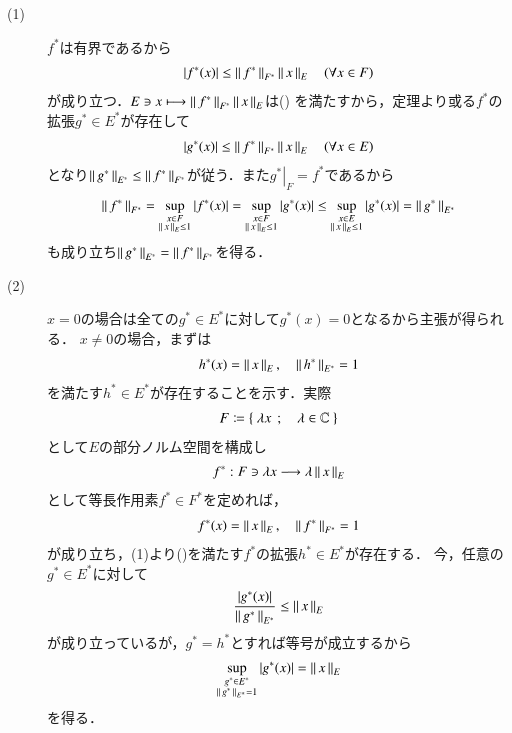 	\begin{prf}\mbox{}
		\begin{description}
			\item[(1)]
				$f^*$は有界であるから
				\begin{align}
					\left| f^*(x) \right| \leq \left\|\, f^*\, \right\|_{F^*} \left\|\, x\, \right\|_{E} \quad (\forall x \in F)
				\end{align}
				が成り立つ．$E \ni x \longmapsto \left\|\, f^*\, \right\|_{F^*} \left\|\, x\, \right\|_{E}$は()
				を満たすから，定理より或る$f^*$の拡張$g^* \in E^*$が存在して
				\begin{align}
					\left| g^*(x) \right| \leq \left\|\, f^*\, \right\|_{F^*} \left\|\, x\, \right\|_{E} \quad (\forall x \in E)
				\end{align}
				となり$\left\|\, g^*\, \right\|_{E^*} \leq \left\|\, f^*\, \right\|_{F^*}$が従う．また$\left. g^* \right|_F = f^*$であるから
				\begin{align}
					\left\|\, f^*\, \right\|_{F^*} = \operatorname*{sup}_{\substack{x \in F \\ \left\|\, x\, \right\|_{E} \leq 1}} \left| f^*(x) \right|
					= \operatorname*{sup}_{\substack{x \in F \\ \left\|\, x\, \right\|_{E} \leq 1}} \left| g^*(x) \right|
					\leq \operatorname*{sup}_{\substack{x \in E \\ \left\|\, x\, \right\|_{E} \leq 1}} \left| g^*(x) \right|
					= \left\|\, g^*\, \right\|_{E^*}
				\end{align}
				も成り立ち$\left\|\, g^*\, \right\|_{E^*} = \left\|\, f^*\, \right\|_{F^*}$を得る．
			
			\item[(2)]
				$x = 0$の場合は全ての$g^* \in E^*$に対して$g^*(x) = 0$となるから主張が得られる．
				$x \neq 0$の場合，まずは
				\begin{align}
					h^*(x) = \left\|\, x\, \right\|_{E},
					\quad \left\|\, h^*\, \right\|_{E^*} = 1
					\label{eq:cor_hahn_banach_extension}
				\end{align}
				を満たす$h^* \in E^*$が存在することを示す．実際
				\begin{align}
					F \coloneqq \left\{\ \lambda x\ \, ; \quad \lambda \in \mathbb{C}\ \right\}
				\end{align}
				として$E$の部分ノルム空間を構成し
				\begin{align}
					f^*:F \ni \lambda x \longrightarrow \lambda \left\|\, x\, \right\|_{E}
				\end{align}
				として等長作用素$f^* \in F^*$を定めれば，
				\begin{align}
					f^*(x) = \left\|\, x\, \right\|_{E},
					\quad \left\|\, f^*\, \right\|_{F^*} = 1
				\end{align}
				が成り立ち，(1)より()を満たす$f^*$の拡張$h^* \in E^*$が存在する．
				今，任意の$g^* \in E^*$に対して
				\begin{align}
					\frac{\left| g^*(x) \right|}{\left\|\, g^*\, \right\|_{E^*}} \leq \left\|\, x\, \right\|_{E}
				\end{align}
				が成り立っているが，$g^* = h^*$とすれば等号が成立するから
				\begin{align}
					\operatorname*{sup}_{\substack{g^* \in E^* \\ \left\|\, g^*\, \right\|_{E^*} = 1}} \left| g^*(x) \right| = \left\|\, x\, \right\|_{E}
				\end{align}
				を得る．
				\QED
		\end{description}
	\end{prf}
	
